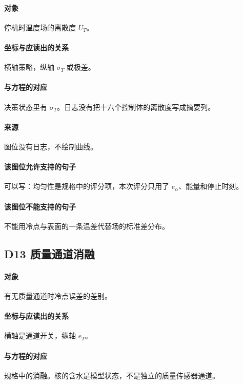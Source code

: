 \paragraph{对象}
停机时温度场的离散度 $U_T$。

\paragraph{坐标与应读出的关系}
横轴策略，纵轴 $\sigma_T$ 或极差。

\paragraph{与方程的对应}
决策状态里有 $\sigma_T$。日志没有把十六个控制体的离散度写成摘要列。

\paragraph{来源}
图位没有日志，不绘制曲线。

\paragraph{该图位允许支持的句子}
可以写：均匀性是规格中的评分项，本次评分只用了 $e_\alpha$、能量和停止时刻。

\paragraph{该图位不能支持的句子}
不能用冷点与表面的一条温差代替场的标准差分布。

\subsection{D13 质量通道消融}
\paragraph{对象}
有无质量通道时冷点误差的差别。

\paragraph{坐标与应读出的关系}
横轴是通道开关，纵轴 $e_T$。

\paragraph{与方程的对应}
规格中的消融。核的含水是模型状态，不是独立的质量传感器通道。


